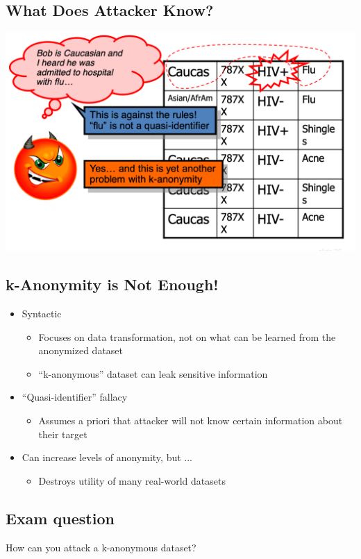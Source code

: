 \documentclass[11pt]{article}
\theoremstyle{definition}
\begin{document}
\subsection{What Does Attacker Know?}
\includegraphics[width=\textwidth/3]{26.png}

\subsection{k-Anonymity is Not Enough!}
\begin{itemize}
    \item Syntactic
    \begin{itemize}
        \item Focuses on data transformation, not on what can be learned from the anonymized dataset
        \item “k-anonymous” dataset can leak sensitive information
    \end{itemize}
    \item “Quasi-identifier” fallacy
    \begin{itemize}
        \item Assumes a priori that attacker will not know certain information about their target
    \end{itemize}
    \item Can increase levels of anonymity, but ...
    \begin{itemize}
        \item Destroys utility of many real-world datasets
    \end{itemize}
\end{itemize}

\subsection{Exam question}
How can you attack a k-anonymous dataset?
\end{document}
